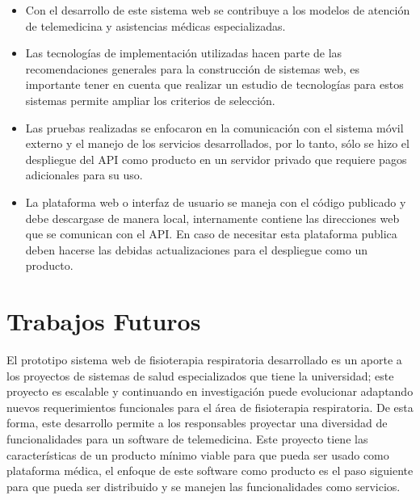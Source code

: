 \documentclass[12pt]{article}
\begin{document}
\begin{itemize}
    \item Con el desarrollo de este sistema web se contribuye a los modelos de atención de telemedicina y asistencias médicas especializadas.
    
    \item Las tecnologías de implementación utilizadas hacen parte de las recomendaciones generales para la construcción de sistemas web, es importante tener en cuenta que realizar un estudio de tecnologías para estos sistemas permite ampliar los criterios de selección.
    
    \item Las pruebas realizadas se enfocaron en la comunicación con el sistema móvil externo y el manejo de los servicios desarrollados, por lo tanto, sólo se hizo el despliegue del API como producto en un servidor privado que requiere pagos adicionales para su uso.
    
    \item La plataforma web o interfaz de usuario se maneja con el código publicado y debe descargase de manera local, internamente contiene las direcciones web que se comunican con el API. En caso de necesitar esta plataforma publica deben hacerse las debidas actualizaciones para el despliegue como un producto.
    
  
    
    
    
    
    
\end{itemize}

\newpage
\section{Trabajos Futuros}

El prototipo sistema web de fisioterapia respiratoria desarrollado es un aporte a los proyectos de sistemas de salud especializados que tiene la universidad; este proyecto es escalable y continuando en investigación puede evolucionar adaptando nuevos requerimientos funcionales para el área de fisioterapia respiratoria. De esta forma, este desarrollo permite a los responsables proyectar una diversidad de funcionalidades para un software de telemedicina. Este proyecto tiene las características de un producto mínimo viable para que pueda ser usado como plataforma médica, el enfoque de este software como producto es el paso siguiente para que pueda ser distribuido y se manejen las funcionalidades como servicios.
\end{document}
